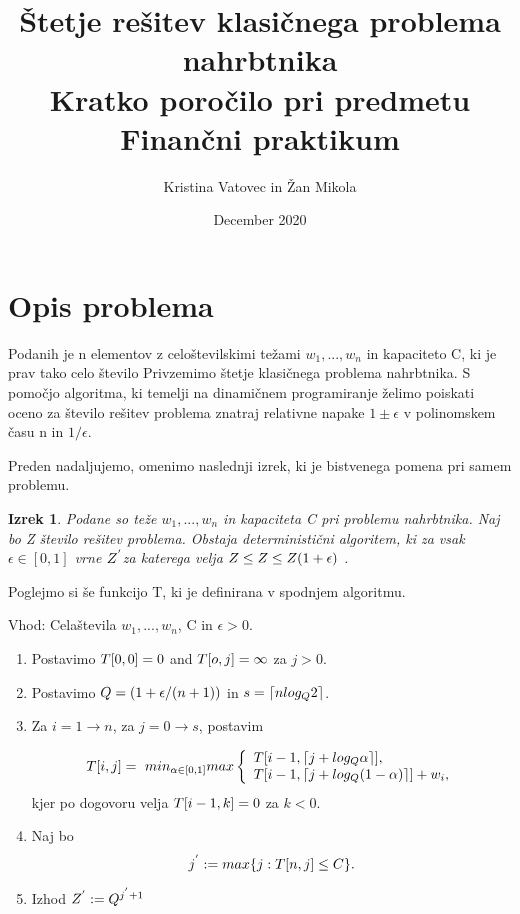 \documentclass[a4paper,15pt]{article}
\title{ \textbf{ Štetje rešitev klasičnega problema nahrbtnika} \\
  \large Kratko poročilo pri predmetu Finančni praktikum}
\author{Kristina Vatovec in Žan Mikola}
\date{December 2020}
\newtheorem{theorem}{Izrek}
\begin{document}
\begin{titlepage}
\maketitle
\thispagestyle{empty}
\pagestyle{empty}
\end{titlepage}


\section{Opis problema}


Podanih je n elementov  z celoštevilskimi težami \(w_{1},...,w_{n}\) in kapaciteto C, ki je prav tako celo število  Privzemimo štetje klasičnega problema nahrbtnika.
S pomočjo algoritma, ki temelji na dinamičnem programiranje želimo poiskati oceno za  število rešitev problema znatraj relativne napake \(1 \pm \epsilon\)  v polinomskem času n in \(1/\epsilon\).
 
\vspace{3mm}
\noindent Preden nadaljujemo, omenimo naslednji izrek, ki je bistvenega pomena pri samem problemu.

\begin{theorem} 
Podane so teže \(w_{1},...,w_{n}\) in kapaciteta C pri problemu nahrbtnika. Naj bo Z število rešitev problema. Obstaja deterministični algoritem, ki za vsak \( \epsilon \in [0,1]\) vrne \(\uppercase{z}^{'} \)za katerega velja  
\( \uppercase{z} \leq \uppercase{z} \leq \uppercase{z}(1 + \epsilon) \) .

\end{theorem}


\noindent Poglejmo si še funkcijo T, ki je definirana v spodnjem algoritmu.

\begin{framed}
Vhod: Celaštevila \(w_{1},...,w_{n}\), C in \( \epsilon > 0\).
\begin{enumerate}
\item Postavimo \(\uppercase{t}[0,0] = 0\) and \(\uppercase{t}[o,j] = \infty \) za \(j > 0\).
\item Postavimo \( \uppercase{q} = ( 1+ \epsilon/(n + 1))\) in \( s= \lceil n log_{\uppercase{q}}2 \rceil\).
\item Za \( i = 1 \to n\), za \( j = 0 \to s \), postavim

\[ 
\uppercase{t}[i, j]=\ min_{\alpha \in [0,1]} max \left\{
\begin{array}{ll}
      \uppercase{t}[i - 1, \lceil j + log_{\uppercase{q}}\alpha \rceil ], \\
      \uppercase{t}[i - 1, \lceil j + log_{\uppercase{q}}(1 - \alpha) \rceil ] + w_{i}, 
      
\end{array} 
\right. 
\]
kjer po dogovoru velja \( \uppercase{t}[i - 1, k] = 0 \) za \( k <0\).

\item Naj bo
\[
j^{'} := max\{j : \uppercase{t}[n, j] \leq \uppercase{C} \}.
\]
\item Izhod \(\uppercase{Z}^{'} := \uppercase{Q}^{j^{'} + 1} \)
\end{enumerate}
\end{framed}
\end{document}
